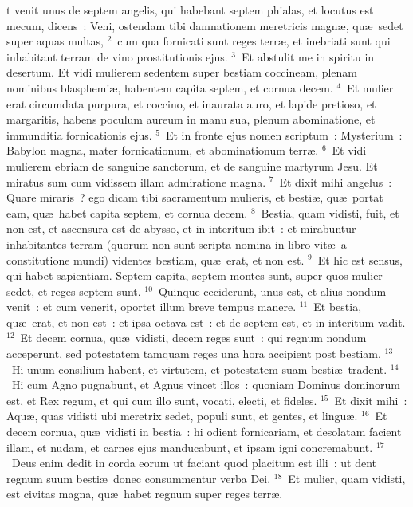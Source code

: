 \bchapter
{}t venit unus de septem angelis, qui habebant septem phialas, et locutus est mecum, dicens~: Veni, ostendam tibi damnationem meretricis magn\ae , qu\ae\ sedet super aquas multas,
${}^{2}$~cum qua fornicati sunt reges terr\ae , et inebriati sunt qui inhabitant terram de vino prostitutionis ejus.
${}^{3}$~Et abstulit me in spiritu in desertum. Et vidi mulierem sedentem super bestiam coccineam, plenam nominibus blasphemi\ae , habentem capita septem, et cornua decem.
${}^{4}$~Et mulier erat circumdata purpura, et coccino, et inaurata auro, et lapide pretioso, et margaritis, habens poculum aureum in manu sua, plenum abominatione, et immunditia fornicationis ejus.
${}^{5}$~Et in fronte ejus nomen scriptum~: Mysterium~: Babylon magna, mater fornicationum, et abominationum terr\ae .
${}^{6}$~Et vidi mulierem ebriam de sanguine sanctorum, et de sanguine martyrum Jesu. Et miratus sum cum vidissem illam admiratione magna.
${}^{7}$~Et dixit mihi angelus~: Quare miraris~? ego dicam tibi sacramentum mulieris, et besti\ae , qu\ae\ portat eam, qu\ae\ habet capita septem, et cornua decem.
${}^{8}$~Bestia, quam vidisti, fuit, et non est, et ascensura est de abysso, et in interitum ibit~: et mirabuntur inhabitantes terram (quorum non sunt scripta nomina in libro vit\ae\ a constitutione mundi) videntes bestiam, qu\ae\ erat, et non est.
${}^{9}$~Et hic est sensus, qui habet sapientiam. Septem capita, septem montes sunt, super quos mulier sedet, et reges septem sunt.
${}^{10}$~Quinque ceciderunt, unus est, et alius nondum venit~: et cum venerit, oportet illum breve tempus manere.
${}^{11}$~Et bestia, qu\ae\ erat, et non est~: et ipsa octava est~: et de septem est, et in interitum vadit.
${}^{12}$~Et decem cornua, qu\ae\ vidisti, decem reges sunt~: qui regnum nondum acceperunt, sed potestatem tamquam reges una hora accipient post bestiam.
${}^{13}$~Hi unum consilium habent, et virtutem, et potestatem suam besti\ae\ tradent.
${}^{14}$~Hi cum Agno pugnabunt, et Agnus vincet illos~: quoniam Dominus dominorum est, et Rex regum, et qui cum illo sunt, vocati, electi, et fideles.
${}^{15}$~Et dixit mihi~: Aqu\ae , quas vidisti ubi meretrix sedet, populi sunt, et gentes, et lingu\ae .
${}^{16}$~Et decem cornua, qu\ae\ vidisti in bestia~: hi odient fornicariam, et desolatam facient illam, et nudam, et carnes ejus manducabunt, et ipsam igni concremabunt.
${}^{17}$~Deus enim dedit in corda eorum ut faciant quod placitum est illi~: ut dent regnum suum besti\ae\ donec consummentur verba Dei.
${}^{18}$~Et mulier, quam vidisti, est civitas magna, qu\ae\ habet regnum super reges terr\ae .

